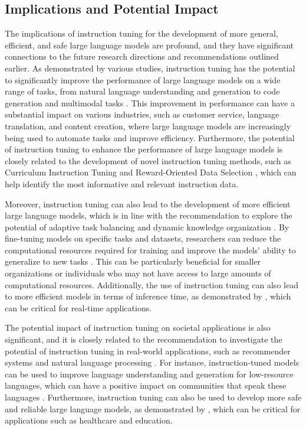 \documentclass[11pt]{article}
\begin{document}
\subsection{Implications and Potential Impact}

The implications of instruction tuning for the development of more general, efficient, and safe large language models are profound, and they have significant connections to the future research directions and recommendations outlined earlier. As demonstrated by various studies, instruction tuning has the potential to significantly improve the performance of large language models on a wide range of tasks, from natural language understanding and generation to code generation and multimodal tasks \cite{ref11}. This improvement in performance can have a substantial impact on various industries, such as customer service, language translation, and content creation, where large language models are increasingly being used to automate tasks and improve efficiency. Furthermore, the potential of instruction tuning to enhance the performance of large language models is closely related to the development of novel instruction tuning methods, such as Curriculum Instruction Tuning \cite{ref137} and Reward-Oriented Data Selection \cite{ref160}, which can help identify the most informative and relevant instruction data.

Moreover, instruction tuning can also lead to the development of more efficient large language models, which is in line with the recommendation to explore the potential of adaptive task balancing \cite{ref14} and dynamic knowledge organization \cite{ref36}. By fine-tuning models on specific tasks and datasets, researchers can reduce the computational resources required for training and improve the models' ability to generalize to new tasks \cite{ref162}. This can be particularly beneficial for smaller organizations or individuals who may not have access to large amounts of computational resources. Additionally, the use of instruction tuning can also lead to more efficient models in terms of inference time, as demonstrated by \cite{ref9}, which can be critical for real-time applications.

The potential impact of instruction tuning on societal applications is also significant, and it is closely related to the recommendation to investigate the potential of instruction tuning in real-world applications, such as recommender systems \cite{ref163} and natural language processing \cite{ref88}. For instance, instruction-tuned models can be used to improve language understanding and generation for low-resource languages, which can have a positive impact on communities that speak these languages \cite{ref139}. Furthermore, instruction tuning can also be used to develop more safe and reliable large language models, as demonstrated by \cite{ref117}, which can be critical for applications such as healthcare and education.
\end{document}
